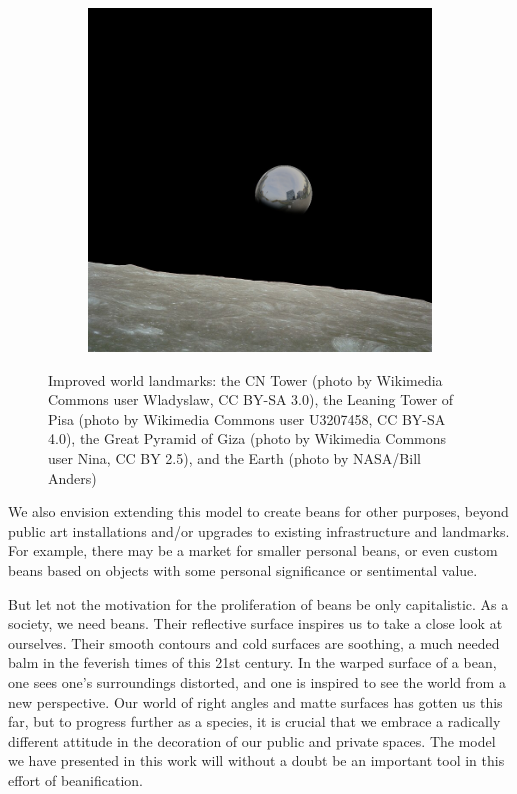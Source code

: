 \documentclass[%
reprint,
twocolumn,
nofootinbib,
 amsmath,amssymb,
 aps,
]{revtex4-2}
\begin{document}
\begin{figure}[H]
\begin{subfigure}{0.23\textwidth}
        \includegraphics[width=0.98\linewidth]{img/bean-earth.jpg}
    \end{subfigure}
    \caption{Improved world landmarks: the CN Tower (photo by Wikimedia Commons user Wladyslaw, CC BY-SA 3.0), the Leaning Tower of Pisa (photo by Wikimedia Commons user U3207458, CC BY-SA 4.0), the Great Pyramid of Giza (photo by Wikimedia Commons user Nina, CC BY 2.5), and the Earth (photo by NASA/Bill Anders)}
    \label{fig:landmarks}
\end{figure}



We also envision extending this model to create beans for other purposes, beyond public art installations and/or upgrades to existing infrastructure and landmarks. For example, there may be a market for smaller personal beans, or even custom beans based on objects with some personal significance or sentimental value. 

But let not the motivation for the proliferation of beans be only capitalistic. As a society, we need beans. Their reflective surface inspires us to take a close look at ourselves. Their smooth contours and cold surfaces are soothing, a much needed balm in the feverish times of this 21st century. In the warped surface of a bean, one sees one's surroundings distorted, and one is inspired to see the world from a new perspective. Our world of right angles and matte surfaces has gotten us this far, but to progress further as a species, it is crucial that we embrace a radically different attitude in the decoration of our public and private spaces. The model we have presented in this work will without a doubt be an important tool in this effort of beanification. 
\end{document}
